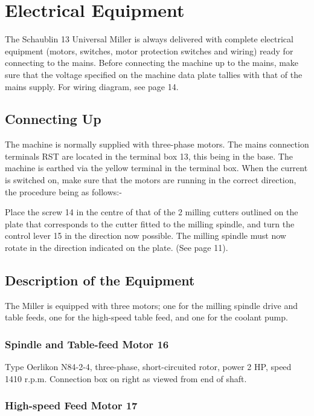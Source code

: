 \chapter{Electrical Equipment}

The Schaublin 13 Universal Miller is always delivered with complete
electrical equipment (motors, switches, motor protection switches
and wiring) ready for connecting to the mains. Before connecting
the machine up to the mains, make sure that the voltage specified
on the machine data plate tallies with that of the mains supply.
For wiring diagram, see page 14.

\section*{Connecting Up}

The machine is normally supplied with three-phase motors. The mains
connection terminals RST are located in the terminal box 13, this
being in the base. The machine is earthed via the yellow terminal
in the terminal box. When the current is switched on, make sure that
the motors are running in the correct direction, the procedure being
as follows:-

Place the screw 14 in the centre of that of the 2 milling cutters
outlined on the plate that corresponds to the cutter fitted to the
milling spindle, and turn the control lever 15 in the direction now
possible. The milling spindle must now rotate in the direction
indicated on the plate. (See page 11).

\section*{Description of the Equipment}

The Miller is equipped with three motors; one for the milling
spindle drive and table feeds, one for the high-speed table feed,
and one for the coolant pump.

\subsection*{Spindle and Table-feed Motor 16}

Type Oerlikon N84-2-4, three-phase, short-circuited rotor, power
2 HP, speed 1410 r.p.m. Connection box on right as viewed from end
of shaft.

\subsection*{High-speed Feed Motor 17}

